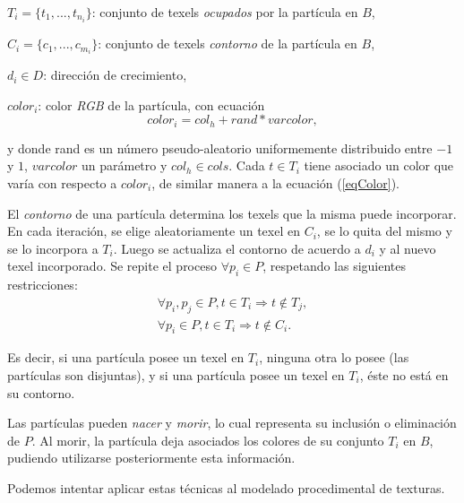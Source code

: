 \documentclass[spanish,a4paper,11pt,oneside,links]{report}
\begin{document}
$T_{i} = \{t_{1}, ... , t_{n_{i}}\}$: conjunto de texels {\em ocupados} por la part\'icula en $B$,

$C_{i} = \{c_{1}, ... , c_{m_{i}}\}$: conjunto de texels {\em contorno} de la part\'icula en $B$,

$d_{i} \in D$: direcci\'on de crecimiento,

$color_{i}$: color {\em RGB} de la part\'icula, con ecuaci\'on \cite{Reeves83}
\begin{equation}
color_{i} = col_{h} + rand * varcolor,
\label{eqColor}
\end{equation}

\noindent
y donde rand es un n\'umero pseudo-aleatorio uniformemente distribuido entre $-1$ y $1$, $varcolor$ un par\'ametro y $col_{h} \in cols$.
Cada $t \in T_{i}$ tiene asociado un color que var\'ia con respecto a $color_{i}$, de similar manera a la ecuaci\'on (\ref{eqColor}).

El {\em contorno} de una part\'icula determina los texels que la misma puede incorporar. 
En cada iteraci\'on, se elige aleatoriamente un texel en $C_{i}$, se lo quita del mismo y se lo incorpora a $T_{i}$.
Luego se actualiza el contorno de acuerdo a $d_{i}$ y al nuevo texel incorporado.
Se repite el proceso $\forall p_{i} \in P$, respetando las siguientes restricciones:
\begin{eqnarray}
\forall p_{i}, p_{j} \in P, t \in T_{i} \Rightarrow t \notin T_{j}, \\
\forall p_{i} \in P, t \in T_{i} \Rightarrow t \notin C_{i}.
\end{eqnarray}

Es decir, si una part\'icula posee un texel en $T_{i}$, ninguna otra lo posee (las part\'iculas son disjuntas), y si una part\'icula posee un texel en $T_{i}$, \'este no est\'a en su contorno.

Las part\'iculas pueden {\em nacer} y {\em morir}, lo cual representa su inclusi\'on o eliminaci\'on de $P$.
Al morir, la part\'icula deja asociados los colores de su conjunto $T_{i}$ en $B$, pudiendo utilizarse posteriormente esta informaci\'on.

Podemos intentar aplicar estas técnicas al modelado procedimental de texturas. 
\end{document}
